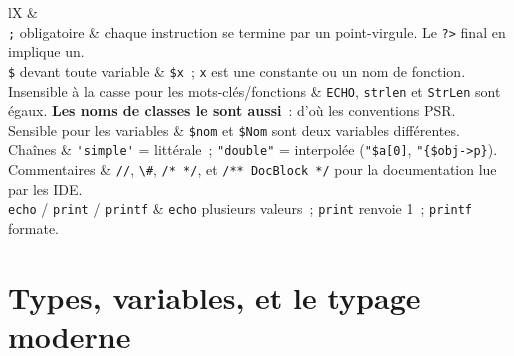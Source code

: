 \begin{tabz}{lX}
  \headrow {} \&  \\
  \midrule
  \verb|;| obligatoire \& chaque instruction se termine par un point-virgule. Le \verb|?>| final en implique un. \\
  \verb|$| devant toute variable \& \verb|$x|~; \verb|x| est une constante ou un nom de fonction. \\
  Insensible \`a la casse pour les mots-cl\'es/fonctions \& \verb|ECHO|, \verb|strlen| et \verb|StrLen| sont \'egaux. \textbf{Les noms de classes le sont aussi}~: d'o\`u les conventions PSR. \\
  Sensible pour les variables \& \verb|$nom| et \verb|$Nom| sont deux variables diff\'erentes. \\
  Cha\^ines \& \verb|'simple'| = litt\'erale~; \verb|"double"| = interpol\'ee (\verb|"$a[0]|, \verb|"{$obj->p}|). \\
  Commentaires \& \verb|//|, \verb|\#|, \verb|/* */|, et \verb|/** DocBlock */| pour la documentation lue par les IDE. \\
  \verb|echo| / \verb|print| / \verb|printf| \& \verb|echo| plusieurs valeurs~; \verb|print| renvoie 1~; \verb|printf| formate. \\
\end{tabz}

\section{Types, variables, et le typage moderne}

